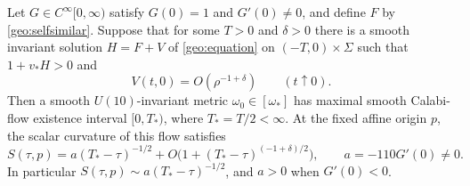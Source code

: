 \begin{lemma}\label{geo:obstruction}
Let \(G\in C^\infty[0,\infty)\) satisfy \(G(0)=1\) and
\(G'(0)\ne0\), and define \(F\) by \eqref{geo:selfsimilar}.  Suppose
that for some \(T>0\) and \(\delta>0\) there is a smooth invariant
solution \(H=F+V\) of \eqref{geo:equation} on \((-T,0)\times\Sigma\)
such that \(1+v_*H>0\) and
\begin{equation}\label{geo:correction-bound}
 V(t,0)=O(\rho^{-1+\delta})\qquad(t\uparrow0).
\end{equation}
Then a smooth \(U(10)\)-invariant metric \(\omega_0\in[\omega_*]\)
has maximal smooth Calabi-flow existence interval \([0,T_*)\), where
\(T_*=T/2<\infty\).  At the fixed affine origin \(p\), the scalar
curvature of this flow satisfies
\begin{equation}\label{geo:curvature-rate}
 S(\tau,p)=a(T_*-\tau)^{-1/2}
       +O\big(1+(T_*-\tau)^{(-1+\delta)/2}\big),\qquad
 a=-110G'(0)\ne0.
\end{equation}
In particular \(S(\tau,p)\sim a(T_*-\tau)^{-1/2}\), and \(a>0\)
when \(G'(0)<0\).
\end{lemma}

